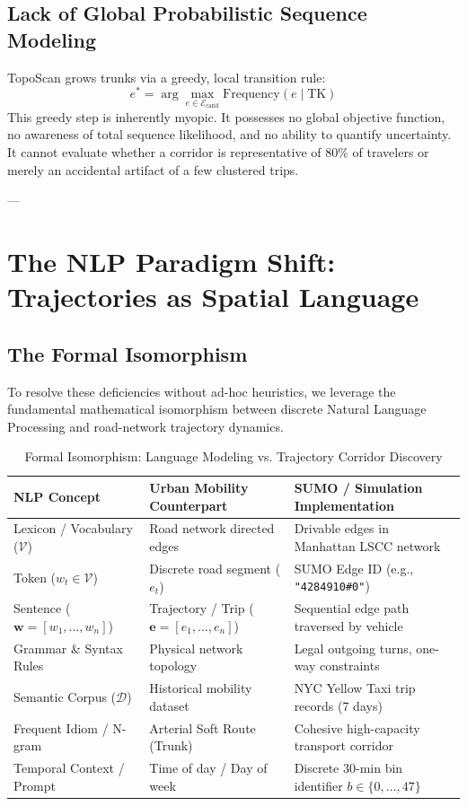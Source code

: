 \documentclass[12pt,a4paper]{article}
\begin{document}
\subsection{Lack of Global Probabilistic Sequence Modeling}
TopoScan grows trunks via a greedy, local transition rule:
\begin{equation}
e^* = \arg\max_{e \in \mathcal{E}_{\text{cand}}} \text{Frequency}(e \mid \text{TK})
\end{equation}
This greedy step is inherently myopic. It possesses no global objective function, no awareness of total sequence likelihood, and no ability to quantify uncertainty. It cannot evaluate whether a corridor is representative of 80\% of travelers or merely an accidental artifact of a few clustered trips.

---

\section{The NLP Paradigm Shift: Trajectories as Spatial Language}

\subsection{The Formal Isomorphism}
To resolve these deficiencies without ad-hoc heuristics, we leverage the fundamental mathematical isomorphism between discrete Natural Language Processing and road-network trajectory dynamics.

\begin{table}[htbp]
\centering
\small
\caption{Formal Isomorphism: Language Modeling vs. Trajectory Corridor Discovery}
\label{tab:isomorphism}
\begin{tabularx}{\textwidth}{@{}p{3.8cm}p{4.8cm}X@{}}
\toprule
\textbf{NLP Concept} & \textbf{Urban Mobility Counterpart} & \textbf{SUMO / Simulation Implementation} \\ \midrule
Lexicon / Vocabulary ($\mathcal{V}$) & Road network directed edges & Drivable edges in Manhattan LSCC network \\ \addlinespace
Token ($w_t \in \mathcal{V}$) & Discrete road segment ($e_t$) & SUMO Edge ID (e.g., \texttt{"4284910\#0"}) \\ \addlinespace
Sentence ($\mathbf{w} = [w_1, \dots, w_n]$) & Trajectory / Trip ($\mathbf{e} = [e_1, \dots, e_n]$) & Sequential edge path traversed by vehicle \\ \addlinespace
Grammar \& Syntax Rules & Physical network topology & Legal outgoing turns, one-way constraints \\ \addlinespace
Semantic Corpus ($\mathcal{D}$) & Historical mobility dataset & NYC Yellow Taxi trip records (7 days) \\ \addlinespace
Frequent Idiom / N-gram & Arterial Soft Route (Trunk) & Cohesive high-capacity transport corridor \\ \addlinespace
Temporal Context / Prompt & Time of day / Day of week & Discrete 30-min bin identifier $b \in \{0, \dots, 47\}$ \\ \bottomrule
\end{tabularx}
\end{table}
\end{document}
